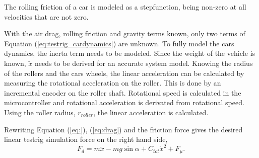 The rolling friction of a car is modeled as a stepfunction, being non-zero at
all velocities that are not zero.

With the air drag, rolling friction and gravity terms known, only two terms of
Equation (\ref{eq:testrig_cardynamics}) are unknown. To fully model the cars
dynamics, the inerta term needs to be modeled. Since the weight of the vehicle
is known, $\ddot{x}$ needs to be derived for an accurate system model.
Knowing the radius of the rollers and the cars wheels, the linear acceleration
can be calculated by measuring the rotational acceleration on the roller. This
is done by an incremental encoder on the roller shaft. Rotational speed is
calculated in the microcontroller and rotational acceleration is derivated from
rotational speed. Using the roller radius, $r_{roller}$, the linear acceleration
is calculated.

Rewriting Equation (\ref{eq:}), (\ref{eq:drag}) and the friction force gives the
desired linear testrig simulation force on the right hand side,
\begin{equation} \label{eq:simulationforce}
    F_d = m\ddot{x} - mg\sin{\alpha} + C_{tot}\dot{x}^2 + F_{\mu}.
\end{equation}

